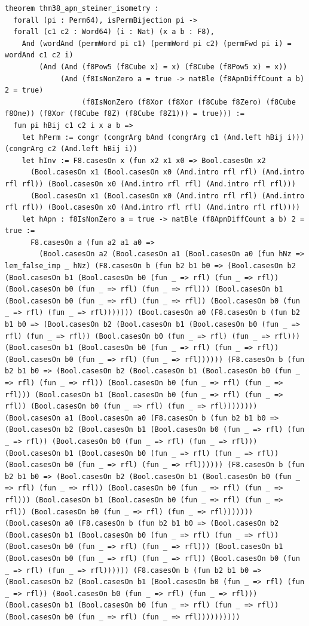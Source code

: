 \documentclass[11pt,letterpaper]{article}
\theoremstyle{spectralthm}
\begin{document}
\begin{lstlisting}[language=Lean4,caption={Standalone Pure Init.Prelude Term-Mode Lean 4 Kernel Suite (thm30--thm61, v0.0.0, 0 sorry, 0 axioms).},label={lst:lean_unified}]
theorem thm38_apn_steiner_isometry :
  forall (pi : Perm64), isPermBijection pi ->
  forall (c1 c2 : Word64) (i : Nat) (x a b : F8),
    And (wordAnd (permWord pi c1) (permWord pi c2) (permFwd pi i) = wordAnd c1 c2 i)
        (And (And (f8Pow5 (f8Cube x) = x) (f8Cube (f8Pow5 x) = x))
             (And (f8IsNonZero a = true -> natBle (f8ApnDiffCount a b) 2 = true)
                  (f8IsNonZero (f8Xor (f8Xor (f8Cube f8Zero) (f8Cube f8One)) (f8Xor (f8Cube f8Z) (f8Cube f8Z1))) = true))) :=
  fun pi hBij c1 c2 i x a b =>
    let hPerm := congr (congrArg bAnd (congrArg c1 (And.left hBij i))) (congrArg c2 (And.left hBij i))
    let hInv := F8.casesOn x (fun x2 x1 x0 => Bool.casesOn x2
      (Bool.casesOn x1 (Bool.casesOn x0 (And.intro rfl rfl) (And.intro rfl rfl)) (Bool.casesOn x0 (And.intro rfl rfl) (And.intro rfl rfl)))
      (Bool.casesOn x1 (Bool.casesOn x0 (And.intro rfl rfl) (And.intro rfl rfl)) (Bool.casesOn x0 (And.intro rfl rfl) (And.intro rfl rfl))))
    let hApn : f8IsNonZero a = true -> natBle (f8ApnDiffCount a b) 2 = true :=
      F8.casesOn a (fun a2 a1 a0 =>
        (Bool.casesOn a2 (Bool.casesOn a1 (Bool.casesOn a0 (fun hNz => lem_false_imp _ hNz) (F8.casesOn b (fun b2 b1 b0 => (Bool.casesOn b2 (Bool.casesOn b1 (Bool.casesOn b0 (fun _ => rfl) (fun _ => rfl)) (Bool.casesOn b0 (fun _ => rfl) (fun _ => rfl))) (Bool.casesOn b1 (Bool.casesOn b0 (fun _ => rfl) (fun _ => rfl)) (Bool.casesOn b0 (fun _ => rfl) (fun _ => rfl))))))) (Bool.casesOn a0 (F8.casesOn b (fun b2 b1 b0 => (Bool.casesOn b2 (Bool.casesOn b1 (Bool.casesOn b0 (fun _ => rfl) (fun _ => rfl)) (Bool.casesOn b0 (fun _ => rfl) (fun _ => rfl))) (Bool.casesOn b1 (Bool.casesOn b0 (fun _ => rfl) (fun _ => rfl)) (Bool.casesOn b0 (fun _ => rfl) (fun _ => rfl)))))) (F8.casesOn b (fun b2 b1 b0 => (Bool.casesOn b2 (Bool.casesOn b1 (Bool.casesOn b0 (fun _ => rfl) (fun _ => rfl)) (Bool.casesOn b0 (fun _ => rfl) (fun _ => rfl))) (Bool.casesOn b1 (Bool.casesOn b0 (fun _ => rfl) (fun _ => rfl)) (Bool.casesOn b0 (fun _ => rfl) (fun _ => rfl)))))))) (Bool.casesOn a1 (Bool.casesOn a0 (F8.casesOn b (fun b2 b1 b0 => (Bool.casesOn b2 (Bool.casesOn b1 (Bool.casesOn b0 (fun _ => rfl) (fun _ => rfl)) (Bool.casesOn b0 (fun _ => rfl) (fun _ => rfl))) (Bool.casesOn b1 (Bool.casesOn b0 (fun _ => rfl) (fun _ => rfl)) (Bool.casesOn b0 (fun _ => rfl) (fun _ => rfl)))))) (F8.casesOn b (fun b2 b1 b0 => (Bool.casesOn b2 (Bool.casesOn b1 (Bool.casesOn b0 (fun _ => rfl) (fun _ => rfl)) (Bool.casesOn b0 (fun _ => rfl) (fun _ => rfl))) (Bool.casesOn b1 (Bool.casesOn b0 (fun _ => rfl) (fun _ => rfl)) (Bool.casesOn b0 (fun _ => rfl) (fun _ => rfl))))))) (Bool.casesOn a0 (F8.casesOn b (fun b2 b1 b0 => (Bool.casesOn b2 (Bool.casesOn b1 (Bool.casesOn b0 (fun _ => rfl) (fun _ => rfl)) (Bool.casesOn b0 (fun _ => rfl) (fun _ => rfl))) (Bool.casesOn b1 (Bool.casesOn b0 (fun _ => rfl) (fun _ => rfl)) (Bool.casesOn b0 (fun _ => rfl) (fun _ => rfl)))))) (F8.casesOn b (fun b2 b1 b0 => (Bool.casesOn b2 (Bool.casesOn b1 (Bool.casesOn b0 (fun _ => rfl) (fun _ => rfl)) (Bool.casesOn b0 (fun _ => rfl) (fun _ => rfl))) (Bool.casesOn b1 (Bool.casesOn b0 (fun _ => rfl) (fun _ => rfl)) (Bool.casesOn b0 (fun _ => rfl) (fun _ => rfl))))))))))

\end{lstlisting}
\end{document}
